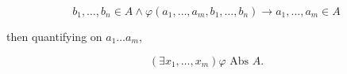 $$b_1, \ldots, b_n \in A \land \varphi(a_1, \ldots, a_m, b_1, \ldots, b_n) \rightarrow a_1, \ldots, a_m \in A$$

then quantifying on $a_1 \ldots a_m$,

$$(\exists x_1, \ldots, x_m) \varphi \text{ Abs } A.$$
